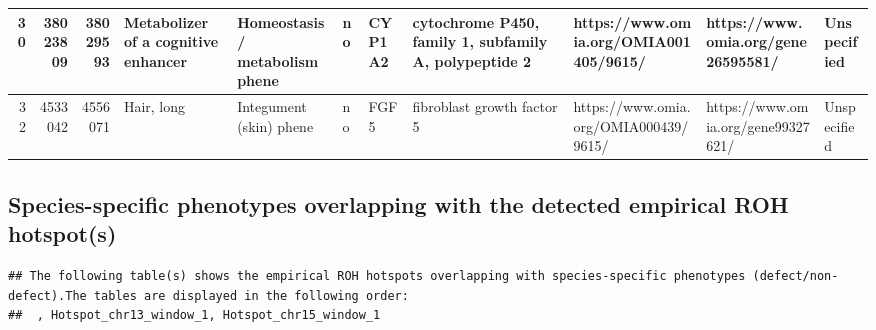 \documentclass[
]{article}
\begin{document}
\begin{table}
\begin{tabular}[t]{r|r|r|l|l|l|l|l|l|l|l}
\hline
30 & 38023809 & 38029593 & Metabolizer of a cognitive enhancer & Homeostasis / metabolism phene & no & CYP1A2 & cytochrome P450, family 1, subfamily A, polypeptide 2 & https://www.omia.org/OMIA001405/9615/ & https://www.omia.org/gene26595581/ & Unspecified\\
\hline
32 & 4533042 & 4556071 & Hair, long & Integument (skin) phene & no & FGF5 & fibroblast growth factor 5 & https://www.omia.org/OMIA000439/9615/ & https://www.omia.org/gene99327621/ & Unspecified\\
\hline
\end{tabular}
\end{table}

\subsection{Species-specific phenotypes overlapping with the detected
empirical ROH
hotspot(s)}\label{species-specific-phenotypes-overlapping-with-the-detected-empirical-roh-hotspots}

\begin{verbatim}
## The following table(s) shows the empirical ROH hotspots overlapping with species-specific phenotypes (defect/non-defect).The tables are displayed in the following order:
##  , Hotspot_chr13_window_1, Hotspot_chr15_window_1
\end{verbatim}
\end{document}
